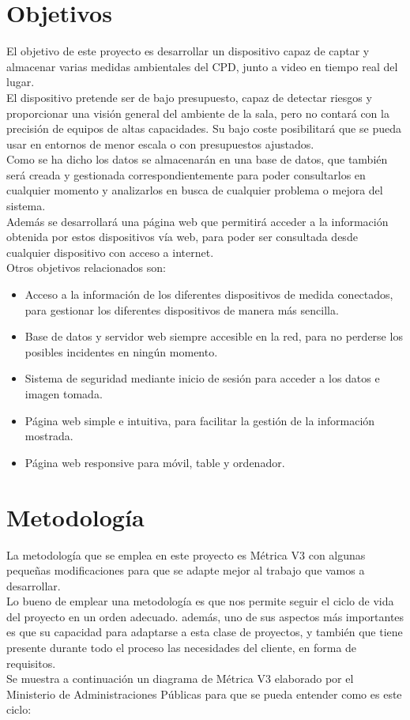 \section{Objetivos}
El objetivo de este proyecto es desarrollar un dispositivo capaz de captar y almacenar varias medidas ambientales del CPD, junto a video en tiempo real del lugar. \\ El dispositivo pretende ser de bajo presupuesto, capaz de detectar riesgos y proporcionar una visión general del ambiente de la sala, pero no contará con la precisión de equipos de altas capacidades. Su bajo coste posibilitará que se pueda usar en entornos de menor escala o con presupuestos ajustados.  \\ Como se ha dicho los datos se almacenarán en una base de datos, que también será creada y gestionada correspondientemente para poder consultarlos en cualquier momento y analizarlos en busca de cualquier problema o mejora del sistema. \\ Además se desarrollará una página web que permitirá acceder a la información obtenida por estos dispositivos vía web, para poder ser consultada desde cualquier dispositivo con acceso a internet. \\ Otros objetivos relacionados son:
\begin{itemize}
    \item Acceso a la información de los diferentes dispositivos de medida conectados, para gestionar los diferentes dispositivos de manera más sencilla.
    \item Base de datos y servidor web siempre accesible en la red, para no perderse los posibles incidentes en ningún momento.
    \item Sistema de seguridad mediante inicio de sesión para acceder a los datos e imagen tomada.
    \item Página web simple e intuitiva, para facilitar la gestión de la información mostrada.
    \item Página web responsive para móvil, table y ordenador.
\end{itemize}

\section{Metodología}
La metodología que se emplea en este proyecto es Métrica V3 \cite{portal_administracion_electronica_metrica_nodate} con algunas pequeñas modificaciones para que se adapte mejor al trabajo que vamos a desarrollar. \\ Lo bueno de emplear una metodología es que nos permite seguir el ciclo de vida del proyecto en un orden adecuado. además, uno de sus aspectos más importantes es que su capacidad para adaptarse a esta clase de proyectos, y también que tiene presente durante todo el proceso las necesidades del cliente, en forma de requisitos. \\ Se muestra a continuación un diagrama de Métrica V3 elaborado por el Ministerio de Administraciones Públicas para que se pueda entender como es este ciclo:

